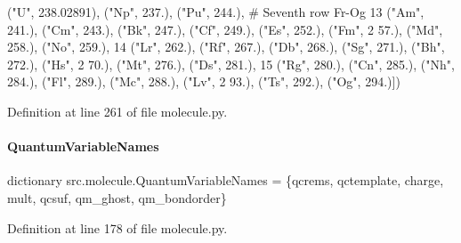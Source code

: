 \begin{DoxyCode}
       (\textcolor{stringliteral}{"U", 238.02891), ("}Np", 237.), ("Pu", 244.), # Seventh row Fr-Og
13                              (\textcolor{stringliteral}{"Am"}, 241.), (\textcolor{stringliteral}{"Cm"}, 243.), (\textcolor{stringliteral}{"Bk"}, 247.), (\textcolor{stringliteral}{"Cf"}, 249.), (\textcolor{stringliteral}{"Es"}, 252.), (\textcolor{stringliteral}{"Fm"}, 2
      57.), (\textcolor{stringliteral}{"Md"}, 258.), (\textcolor{stringliteral}{"No"}, 259.),
14                              (\textcolor{stringliteral}{"Lr"}, 262.), (\textcolor{stringliteral}{"Rf"}, 267.), (\textcolor{stringliteral}{"Db"}, 268.), (\textcolor{stringliteral}{"Sg"}, 271.), (\textcolor{stringliteral}{"Bh"}, 272.), (\textcolor{stringliteral}{"Hs"}, 2
      70.), (\textcolor{stringliteral}{"Mt"}, 276.), (\textcolor{stringliteral}{"Ds"}, 281.),
15                              (\textcolor{stringliteral}{"Rg"}, 280.), (\textcolor{stringliteral}{"Cn"}, 285.), (\textcolor{stringliteral}{"Nh"}, 284.), (\textcolor{stringliteral}{"Fl"}, 289.), (\textcolor{stringliteral}{"Mc"}, 288.), (\textcolor{stringliteral}{"Lv"}, 2
      93.), (\textcolor{stringliteral}{"Ts"}, 292.), (\textcolor{stringliteral}{"Og"}, 294.)])
\end{DoxyCode}


Definition at line 261 of file molecule.\+py.

\mbox{\label{namespacesrc_1_1molecule_a63e784c5358f77bcf929f5f5a312b845}} 
\paragraph{\texorpdfstring{Quantum\+Variable\+Names}{QuantumVariableNames}}
{\footnotesize\ttfamily dictionary src.\+molecule.\+Quantum\+Variable\+Names = \{\textquotesingle{}qcrems\textquotesingle{}, \textquotesingle{}qctemplate\textquotesingle{}, \textquotesingle{}charge\textquotesingle{}, \textquotesingle{}mult\textquotesingle{}, \textquotesingle{}qcsuf\textquotesingle{}, \textquotesingle{}qm\+\_\+ghost\textquotesingle{}, \textquotesingle{}qm\+\_\+bondorder\textquotesingle{}\}}



Definition at line 178 of file molecule.\+py.

\mbox{\label{namespacesrc_1_1molecule_a5a46092fd77c5b3b4cdbe06017ff9bd7}} 
